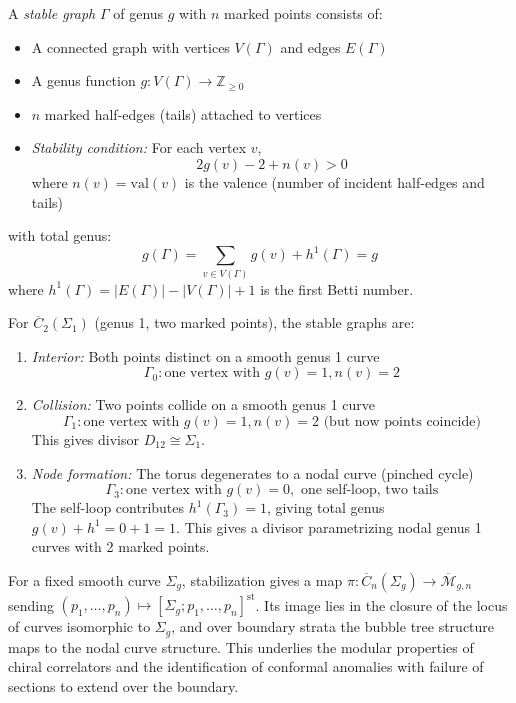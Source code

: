 \begin{definition}\label{def:stable-graph}
A \emph{stable graph} $\Gamma$ of genus $g$ with $n$ marked points consists of:
\begin{itemize}
\item A connected graph with vertices $V(\Gamma)$ and edges $E(\Gamma)$
\item A genus function $g: V(\Gamma) \to \mathbb{Z}_{\geq 0}$
\item $n$ marked half-edges (tails) attached to vertices
\item \emph{Stability condition:} For each vertex $v$, 
\[2g(v) - 2 + n(v) > 0\]
where $n(v) = \text{val}(v)$ is the valence (number of incident half-edges and tails)
\end{itemize}
with total genus:
\[g(\Gamma) = \sum_{v \in V(\Gamma)} g(v) + h^1(\Gamma) = g\]
where $h^1(\Gamma) = |E(\Gamma)| - |V(\Gamma)| + 1$ is the first Betti number.
\end{definition}

\begin{example}[Stable graphs at genus 1, \texorpdfstring{$n=2$}{n=2}]\label{ex:stable-graphs-g1-n2}
For $\overline{C}_2(\Sigma_1)$ (genus 1, two marked points), the stable graphs are:

\begin{enumerate}
\item \emph{Interior:} Both points distinct on a smooth genus 1 curve
\[\Gamma_0: \text{one vertex with } g(v) = 1, n(v) = 2\]

\item \emph{Collision:} Two points collide on a smooth genus 1 curve  
\[\Gamma_1: \text{one vertex with } g(v) = 1, n(v) = 2 \text{ (but now points coincide)}\]
This gives divisor $D_{12} \cong \Sigma_1$.

\item \emph{Node formation:} The torus degenerates to a nodal curve (pinched cycle)
\[\Gamma_3: \text{one vertex with } g(v) = 0, \text{ one self-loop, two tails}\]
The self-loop contributes $h^1(\Gamma_3) = 1$, giving total genus $g(v) + h^1 = 0 + 1 = 1$.
This gives a divisor parametrizing nodal genus 1 curves with 2 marked points.
\end{enumerate}
\end{example}

\begin{remark}\label{rem:moduli-stable-curves}
For a fixed smooth curve $\Sigma_g$, stabilization gives a map $\pi: \overline{C}_n(\Sigma_g) \to \overline{\mathcal{M}}_{g,n}$ sending $(p_1, \ldots, p_n) \mapsto [\Sigma_g; p_1, \ldots, p_n]^{\mathrm{st}}$.  Its image lies in the closure of the locus of curves isomorphic to $\Sigma_g$, and over boundary strata the bubble tree structure maps to the nodal curve structure.  This underlies the modular properties of chiral correlators and the identification of conformal anomalies with failure of sections to extend over the boundary.
\end{remark}

